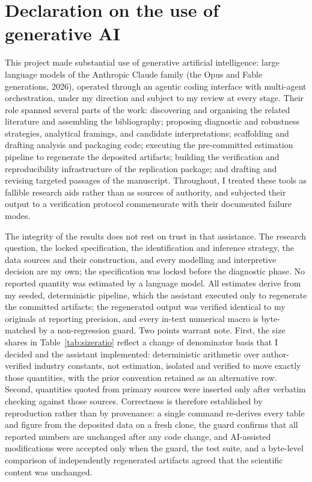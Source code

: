 \section*{Declaration on the use of generative AI}
\label{sec:ai-declaration}

This project made substantial use of generative artificial intelligence:
large language models of the Anthropic Claude family (the Opus and Fable
generations, 2026), operated through an agentic coding interface with
multi-agent orchestration, under my direction and subject to my review at
every stage. Their role spanned several parts of the work: discovering and
organising the related literature and assembling the bibliography; proposing
diagnostic and robustness strategies, analytical framings, and candidate
interpretations; scaffolding and drafting analysis and packaging code;
executing the pre-committed estimation pipeline to regenerate the deposited
artifacts; building the verification and reproducibility infrastructure of
the replication package; and drafting and revising targeted passages of the
manuscript. Throughout, I treated these tools as fallible research aids
rather than as sources of authority, and subjected their output to a
verification protocol commensurate with their documented failure modes.

The integrity of the results does not rest on trust in that assistance. The
research question, the locked specification, the identification and
inference strategy, the data sources and their construction, and every
modelling and interpretive decision are my own; the specification was locked
before the diagnostic phase. No reported quantity was estimated by a
language model. All estimates derive from my seeded, deterministic pipeline,
which the assistant executed only to regenerate the committed artifacts; the
regenerated output was verified identical to my originals at reporting
precision, and every in-text numerical macro is byte-matched by a
non-regression guard. Two points warrant note. First, the size shares in
Table~\ref{tab:sizeratio} reflect a change of denominator basis that I
decided and the assistant implemented: deterministic arithmetic over
author-verified industry constants, not estimation, isolated and verified to
move exactly those quantities, with the prior convention retained as an
alternative row. Second, quantities quoted from primary sources were
inserted only after verbatim checking against those sources. Correctness is
therefore established by reproduction rather than by provenance: a single
command re-derives every table and figure from the deposited data on a fresh
clone, the guard confirms that all reported numbers are unchanged after any
code change, and AI-assisted modifications were accepted only when the
guard, the test suite, and a byte-level comparison of independently
regenerated artifacts agreed that the scientific content was unchanged.

